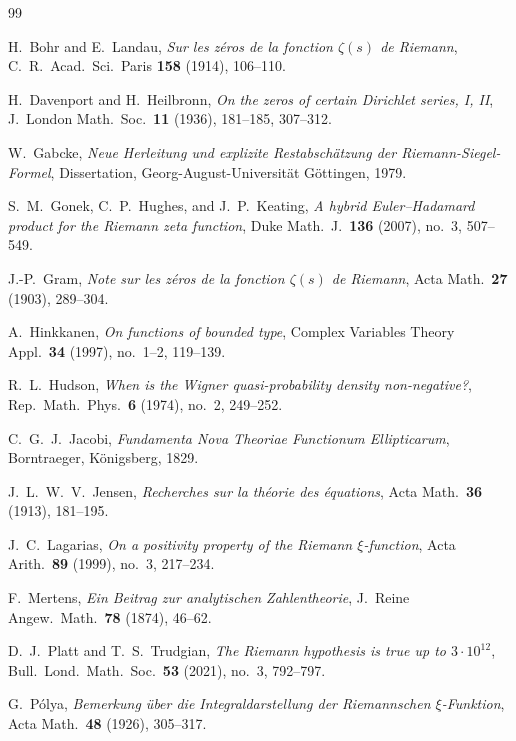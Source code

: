 \documentclass[11pt,reqno]{amsart}
\theoremstyle{plain}
\theoremstyle{definition}
\theoremstyle{remark}
\numberwithin{equation}{section}
\begin{document}
\begin{thebibliography}{99}

H.~Bohr and E.~Landau, \emph{Sur les z\'eros de la fonction $\zeta(s)$ de Riemann}, C.\ R.\ Acad.\ Sci.\ Paris \textbf{158} (1914), 106--110.

H.~Davenport and H.~Heilbronn, \emph{On the zeros of certain Dirichlet series, I, II}, J.\ London Math.\ Soc.\ \textbf{11} (1936), 181--185, 307--312.

W.~Gabcke, \emph{Neue Herleitung und explizite Restabsch\"atzung der Riemann-Siegel-Formel}, Dissertation, Georg-August-Universit\"at G\"ottingen, 1979.

S.~M.~Gonek, C.~P.~Hughes, and J.~P.~Keating, \emph{A hybrid Euler--Hadamard product for the Riemann zeta function}, Duke Math.\ J.\ \textbf{136} (2007), no.~3, 507--549.

J.-P.~Gram, \emph{Note sur les z\'eros de la fonction $\zeta(s)$ de Riemann}, Acta Math.\ \textbf{27} (1903), 289--304.

A.~Hinkkanen, \emph{On functions of bounded type}, Complex Variables Theory Appl.\ \textbf{34} (1997), no.~1--2, 119--139.

R.~L.~Hudson, \emph{When is the Wigner quasi-probability density non-negative?}, Rep.\ Math.\ Phys.\ \textbf{6} (1974), no.~2, 249--252.

C.~G.~J.~Jacobi, \emph{Fundamenta Nova Theoriae Functionum Ellipticarum}, Borntraeger, K\"onigsberg, 1829.

J.~L.~W.~V.~Jensen, \emph{Recherches sur la th\'eorie des \'equations}, Acta Math.\ \textbf{36} (1913), 181--195.

J.~C.~Lagarias, \emph{On a positivity property of the Riemann $\xi$-function}, Acta Arith.\ \textbf{89} (1999), no.~3, 217--234.

F.~Mertens, \emph{Ein Beitrag zur analytischen Zahlentheorie}, J.\ Reine Angew.\ Math.\ \textbf{78} (1874), 46--62.

D.~J.~Platt and T.~S.~Trudgian, \emph{The Riemann hypothesis is true up to $3\cdot 10^{12}$}, Bull.\ Lond.\ Math.\ Soc.\ \textbf{53} (2021), no.~3, 792--797.

G.~P\'olya, \emph{Bemerkung \"uber die Integraldarstellung der Riemannschen $\xi$-Funktion}, Acta Math.\ \textbf{48} (1926), 305--317.


\end{thebibliography}
\end{document}
